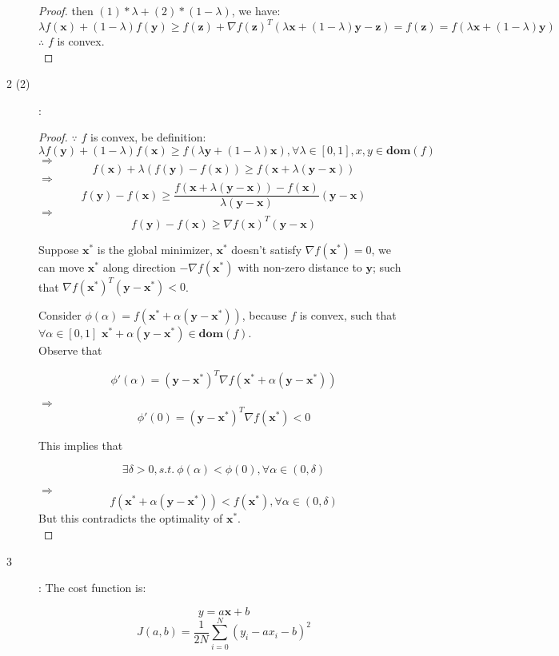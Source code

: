 \documentclass[UTF8]{ctexart}
\begin{document}
\begin{description}
\begin{proof}
then $(1)*\lambda+(2)*(1-\lambda)$, we have:
$$\lambda f(\bm{x}) + (1-\lambda)f(\bm{y}) \geq f(\bm{z}) + \nabla f(\bm{z})^T(\lambda \bm{x}+(1-\lambda)\bm{y} - \bm{z})=f(\bm{z})=f(\lambda \bm{x}+(1-\lambda)\bm{y})$$
$\therefore$ $f$ is convex.\\
\end{proof}
\item[2 (2)]:
\begin{proof}
$\because$ $f$ is convex, be definition:
$$\lambda f(\bm{y}) + (1-\lambda)f(\bm{x}) \geq f(\lambda \bm{y}+(1-\lambda)\bm{x}), \forall \lambda \in [0,1], x,y\in\bm{dom}(f)$$
$\Rightarrow$
$$f(\bm{x}) + \lambda(f(\bm{y})-f(\bm{x})) \geq f(\bm{x}+\lambda(\bm{y}-\bm{x}))$$
$\Rightarrow$
$$f(\bm{y})-f(\bm{x}) \geq \frac{f(\bm{x}+\lambda(\bm{y}-\bm{x})) - f(\bm{x})}{\lambda(\bm{y}-\bm{x})}(\bm{y} - \bm{x})$$
$\Rightarrow$
$$f(\bm{y})-f(\bm{x}) \geq \nabla f(\bm{x})^T(\bm{y}-\bm{x})$$

Suppose $\bm{x^*}$ is the global minimizer, $\bm{x^*}$ doesn't satisfy $\nabla f(\bm{x^*}) = 0$, we can move $\bm{x^*}$ along direction $-\nabla f(\bm{x^*})$ with non-zero distance to $\bm{y}$; such that $\nabla f(\bm{x^*})^T(\bm{y}-\bm{x^*}) < 0$.
\par Consider $\phi(\alpha) = f(\bm{x^*}+\alpha(\bm{y}-\bm{x^*}))$, because $f$ is convex, such that $\forall \alpha \in [0,1]$ $\bm{x^*} + \alpha(\bm{y}-\bm{x^*}) \in \bm{dom}(f)$.\\
Observe that

$$\phi\prime(\alpha) = (\bm{y}-\bm{x^*})^T \nabla f(\bm{x^*}+\alpha(\bm{y}-\bm{x^*}))$$

$\Rightarrow$ $$\phi\prime(0) = (\bm{y}-\bm{x^*})^T\nabla f(\bm{x^*}) < 0$$


This implies that

$$\exists \delta > 0, s.t.\ \phi(\alpha) < \phi(0), \forall \alpha \in (0, \delta)$$

$\Rightarrow$ $$f(\bm{x^*} + \alpha(\bm{y}-\bm{x^*})) < f(\bm{x^*}), \forall \alpha \in (0, \delta)$$
But this contradicts the optimality of $\bm{x^*}$.\\

\end{proof}

\item[3]: The cost function is:

$$y = a\bm{x} + b$$
$$J(a,b) = \frac{1}{2N}\sum_{i=0}^{N}(y_i - ax_i - b)^2$$


\end{description}
\end{document}
